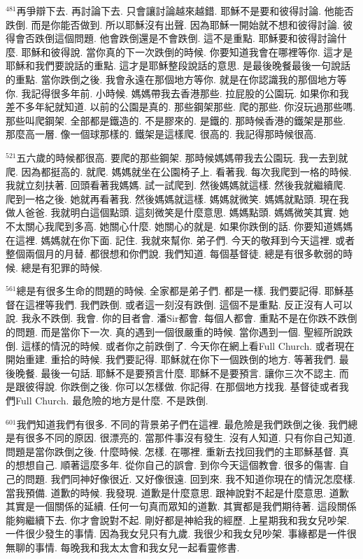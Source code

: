 \documentclass{book}
\begin{document}
$^{481}$再爭辯下去.
再討論下去.
只會讓討論越來越錯.
耶穌不是要和彼得討論.
他能否跌倒.
而是你能否做到.
所以耶穌沒有出聲.
因為耶穌一開始就不想和彼得討論.
彼得會否跌倒這個問題.
他會跌倒還是不會跌倒.
這不是重點.
耶穌要和彼得討論什麼.
耶穌和彼得說.
當你真的下一次跌倒的時候.
你要知道我會在哪裡等你.
這才是耶穌和我們要說話的重點.
這才是耶穌整段說話的意思.
是最後晚餐最後一句說話的重點.
當你跌倒之後.
我會永遠在那個地方等你.
就是在你認識我的那個地方等你.
我記得很多年前.
小時候.
媽媽帶我去香港那些.
拉屁股的公園玩.
如果你和我差不多年紀就知道.
以前的公園是真的.
那些鋼架那些.
爬的那些.
你沒玩過那些嗎.
那些叫爬鋼架.
全部都是鐵造的.
不是膠來的.
是鐵的.
那時候香港的鐵架是那些.
那麼高一層.
像一個球那樣的.
鐵架是這樣爬.
很高的.
我記得那時候很高.

$^{521}$五六歲的時候都很高.
要爬的那些鋼架.
那時候媽媽帶我去公園玩.
我一去到就爬.
因為都挺高的.
就爬.
媽媽就坐在公園椅子上.
看著我.
每次我爬到一格的時候.
我就立刻扶著.
回頭看著我媽媽.
試一試爬到.
然後媽媽就這樣.
然後我就繼續爬.
爬到一格之後.
她就再看著我.
然後媽媽就這樣.
媽媽就微笑.
媽媽就點頭.
現在我做人爸爸.
我就明白這個點頭.
這刻微笑是什麼意思.
媽媽點頭.
媽媽微笑其實.
她不太關心我爬到多高.
她關心什麼.
她關心的就是.
如果你跌倒的話.
你要知道媽媽在這裡.
媽媽就在你下面.
記住.
我就來幫你.
弟子們.
今天的敬拜到今天這裡.
或者整個兩個月的月替.
都很想和你們說.
我們知道.
每個基督徒.
總是有很多軟弱的時候.
總是有犯罪的時候.

$^{561}$總是有很多生命的問題的時候.
全家都是弟子們.
都是一樣.
我們要記得.
耶穌基督在這裡等我們.
我們跌倒.
或者這一刻沒有跌倒.
這個不是重點.
反正沒有人可以說.
我永不跌倒.
我會.
你的目者會.
潘Sir都會.
每個人都會.
重點不是在你跌不跌倒的問題.
而是當你下一次.
真的遇到一個很嚴重的時候.
當你遇到一個.
聖經所說跌倒.
這樣的情況的時候.
或者你之前跌倒了.
今天你在網上看Full Church.
或者現在開始重建.
重拾的時候.
我們要記得.
耶穌就在你下一個跌倒的地方.
等著我們.
最後晚餐.
最後一句話.
耶穌不是要預言什麼.
耶穌不是要預言.
讓你三次不認主.
而是跟彼得說.
你跌倒之後.
你可以怎樣做.
你記得.
在那個地方找我.
基督徒或者我們Full Church.
最危險的地方是什麼.
不是跌倒.

$^{601}$我們知道我們有很多.
不同的背景弟子們在這裡.
最危險是我們跌倒之後.
我們總是有很多不同的原因.
很漂亮的.
當那件事沒有發生.
沒有人知道.
只有你自己知道.
問題是當你跌倒之後.
什麼時候.
怎樣.
在哪裡.
重新去找回我們的主耶穌基督.
真的想想自己.
順著這麼多年.
從你自己的誤會.
到你今天這個教會.
很多的傷害.
自己的問題.
我們同神好像很近.
又好像很遠.
回到來.
我不知道你現在的情況怎麼樣.
當我預備.
道歉的時候.
我發現.
道歉是什麼意思.
跟神說對不起是什麼意思.
道歉其實是一個關係的延續.
任何一句真而眾知的道歉.
其實都是我們期待著.
這段關係能夠繼續下去.
你才會說對不起.
剛好都是神給我的經歷.
上星期我和我女兒吵架.
一件很少發生的事情.
因為我女兒只有九歲.
我很少和我女兒吵架.
事緣都是一件很無聊的事情.
每晚我和我太太會和我女兒一起看靈修書.
\end{document}
